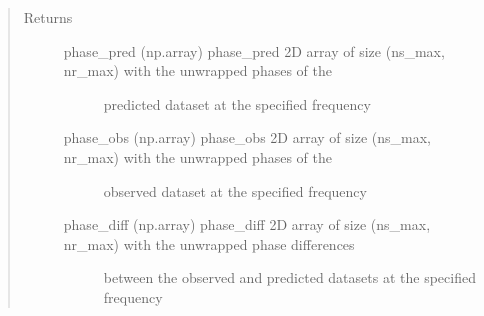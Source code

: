 \documentclass[letterpaper,10pt,english]{sphinxmanual}
\begin{document}
\begin{fulllineitems}
\begin{quote}
\begin{description}
\item[{Returns}] \leavevmode
\begin{description}
\item[{phase\_pred  (np.array)  phase\_pred  2D array of size (ns\_max, nr\_max) with the unwrapped phases of the}] \leavevmode
predicted dataset at the specified frequency

\item[{phase\_obs   (np.array)  phase\_obs  2D array of size (ns\_max, nr\_max) with the unwrapped phases of the}] \leavevmode
observed dataset at the specified frequency

\item[{phase\_diff  (np.array)  phase\_diff  2D array of size (ns\_max, nr\_max) with the unwrapped phase differences}] \leavevmode
between the observed and predicted datasets at the specified frequency

\end{description}


\end{description}\end{quote}

\end{fulllineitems}

\end{document}
